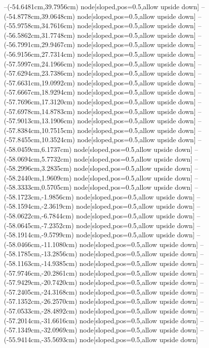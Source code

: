 --(-54.6481cm,39.7956cm) node[sloped,pos=0.5,allow upside down]{\arrowIn}
--(-54.8778cm,39.0648cm) node[sloped,pos=0.5,allow upside down]{\arrowIn}
--(-55.9758cm,34.7616cm) node[sloped,pos=0.5,allow upside down]{\ArrowIn}
--(-56.5862cm,31.7748cm) node[sloped,pos=0.5,allow upside down]{\ArrowIn}
--(-56.7991cm,29.9467cm) node[sloped,pos=0.5,allow upside down]{\ArrowIn}
--(-56.9156cm,27.7314cm) node[sloped,pos=0.5,allow upside down]{\ArrowIn}
--(-57.5997cm,24.1966cm) node[sloped,pos=0.5,allow upside down]{\ArrowIn}
--(-57.6294cm,23.7386cm) node[sloped,pos=0.5,allow upside down]{\arrowIn}
--(-57.6631cm,19.0992cm) node[sloped,pos=0.5,allow upside down]{\ArrowIn}
--(-57.6667cm,18.9294cm) node[sloped,pos=0.5,allow upside down]{\arrowIn}
--(-57.7696cm,17.3120cm) node[sloped,pos=0.5,allow upside down]{\ArrowIn}
--(-57.6978cm,14.8783cm) node[sloped,pos=0.5,allow upside down]{\ArrowIn}
--(-57.9013cm,13.1906cm) node[sloped,pos=0.5,allow upside down]{\ArrowIn}
--(-57.8384cm,10.7515cm) node[sloped,pos=0.5,allow upside down]{\ArrowIn}
--(-57.8455cm,10.3524cm) node[sloped,pos=0.5,allow upside down]{\arrowIn}
--(-58.0459cm,6.1737cm) node[sloped,pos=0.5,allow upside down]{\ArrowIn}
--(-58.0694cm,5.7732cm) node[sloped,pos=0.5,allow upside down]{\arrowIn}
--(-58.2996cm,3.2835cm) node[sloped,pos=0.5,allow upside down]{\ArrowIn}
--(-58.2440cm,1.9609cm) node[sloped,pos=0.5,allow upside down]{\ArrowIn}
--(-58.3333cm,0.5705cm) node[sloped,pos=0.5,allow upside down]{\ArrowIn}
--(-58.1723cm,-1.9856cm) node[sloped,pos=0.5,allow upside down]{\ArrowIn}
--(-58.1594cm,-2.3619cm) node[sloped,pos=0.5,allow upside down]{\arrowIn}
--(-58.0622cm,-6.7844cm) node[sloped,pos=0.5,allow upside down]{\ArrowIn}
--(-58.0645cm,-7.2352cm) node[sloped,pos=0.5,allow upside down]{\arrowIn}
--(-58.1914cm,-9.5799cm) node[sloped,pos=0.5,allow upside down]{\ArrowIn}
--(-58.0466cm,-11.1080cm) node[sloped,pos=0.5,allow upside down]{\ArrowIn}
--(-58.1785cm,-13.2856cm) node[sloped,pos=0.5,allow upside down]{\ArrowIn}
--(-58.1163cm,-14.9385cm) node[sloped,pos=0.5,allow upside down]{\ArrowIn}
--(-57.9746cm,-20.2861cm) node[sloped,pos=0.5,allow upside down]{\ArrowIn}
--(-57.9429cm,-20.7420cm) node[sloped,pos=0.5,allow upside down]{\arrowIn}
--(-57.2405cm,-24.3168cm) node[sloped,pos=0.5,allow upside down]{\ArrowIn}
--(-57.1352cm,-26.2570cm) node[sloped,pos=0.5,allow upside down]{\ArrowIn}
--(-57.0533cm,-28.4892cm) node[sloped,pos=0.5,allow upside down]{\ArrowIn}
--(-57.2014cm,-31.6616cm) node[sloped,pos=0.5,allow upside down]{\ArrowIn}
--(-57.1349cm,-32.0969cm) node[sloped,pos=0.5,allow upside down]{\arrowIn}
--(-55.9414cm,-35.5693cm) node[sloped,pos=0.5,allow upside down]{\ArrowIn}
